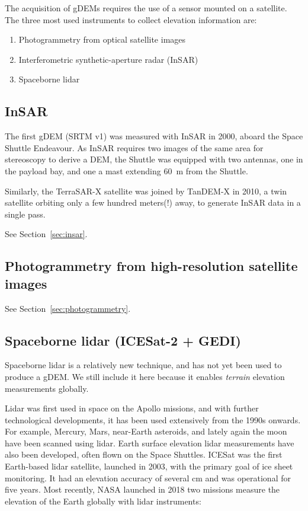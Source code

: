 The acquisition of gDEMs requires the use of a sensor mounted on a satellite.
The three most used instruments to collect elevation information are:

\begin{enumerate}
  \item Photogrammetry from optical satellite images
  \item Interferometric synthetic-aperture radar (InSAR)
  \item Spaceborne lidar
\end{enumerate}

\subsection{InSAR}

The first gDEM (SRTM v1) was measured with InSAR in 2000, aboard the Space Shuttle Endeavour.
As InSAR requires two images of the same area for stereoscopy to derive a DEM, the Shuttle was equipped with two antennas, one in the payload bay, and one a mast extending \qty{60}{m} from the Shuttle.

Similarly, the TerraSAR-X satellite was joined by TanDEM-X in 2010, a twin satellite orbiting only a few hundred meters(!) away, to generate InSAR data in a single pass.

See Section~\ref{sec:insar}.

\subsection{Photogrammetry from high-resolution satellite images}

See Section~\ref{sec:photogrammetry}.




\subsection{Spaceborne lidar (ICESat-2 + GEDI)}
Spaceborne lidar is a relatively new technique, and has not yet been used to produce a gDEM.
We still include it here because it enables \emph{terrain} elevation measurements globally.

Lidar was first used in space on the Apollo missions, and with further technological developments, it has been used extensively from the 1990s onwards.
For example, Mercury, Mars, near-Earth asteroids, and lately again the moon have been scanned using lidar.
Earth surface elevation lidar measurements have also been developed, often flown on the Space Shuttles.
ICESat was the first Earth-based lidar satellite, launched in 2003, with the primary goal of ice sheet monitoring.
It had an elevation accuracy of several cm and was operational for five years.
Most recently, NASA launched in 2018 two missions measure the elevation of the Earth globally with lidar instruments:


